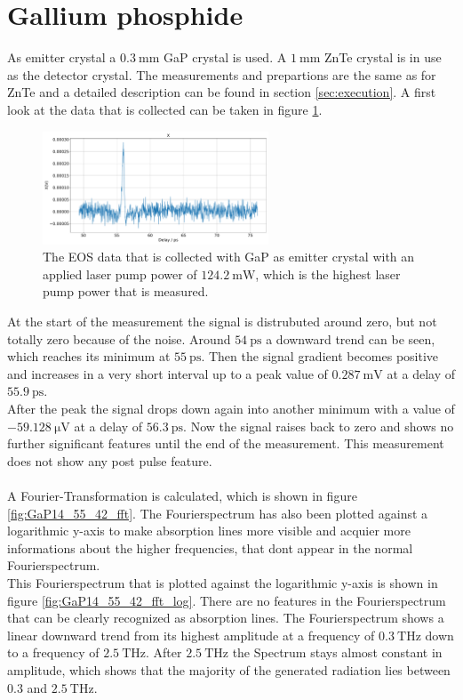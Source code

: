 \section{Gallium phosphide}
As emitter crystal a $\SI{0.3}{\milli\meter}$ GaP crystal is used.
A $\SI{1}{\milli\meter}$ ZnTe crystal is in use as the detector crystal.
The measurements and prepartions are the same as for ZnTe and a detailed description can be found in section \ref{sec:execution}.
A first look at the data that is collected can be taken in figure \ref{fig:GaP14_55_42normalX}.
\\
\begin{figure}
    \centering
    \includegraphics[width=0.6\textwidth]{Plots/GaP14_55_42normalX.pdf}
    \caption{The EOS data that is collected with GaP as emitter crystal with an applied laser pump power of $\SI{124.2}{\milli\W}$, which is the highest laser pump power that is measured.}
    \label{fig:GaP14_55_42normalX}
\end{figure}
At the start of the measurement the signal is distrubuted around zero, but not totally zero because of the noise.
Around $\SI{54}{\pico\second}$ a downward trend can be seen, which reaches its minimum at $\SI{55}{\pico\second}$.
Then the signal gradient becomes positive and increases in a very short interval up to a peak value of $\SI{0.287}{\milli\V}$ at a delay of $\SI{55.9}{\pico\second}$.
\\
After the peak the signal drops down again into another minimum with a value of $\SI{-59.128}{\micro\V}$ at a delay of $\SI{56.3}{\pico\second}$.
Now the signal raises back to zero and shows no further significant features until the end of the measurement.
This measurement does not show any post pulse feature.
\\\\
A Fourier-Transformation is calculated, which is shown in figure \ref{fig:GaP14_55_42_fft}.
The Fourierspectrum has also been plotted against a logarithmic y-axis to make absorption lines more visible and acquier more informations about the higher frequencies, that dont appear in the normal Fourierspectrum.
\\
This Fourierspectrum that is plotted against the logarithmic y-axis is shown in figure \ref{fig:GaP14_55_42_fft_log}.
There are no features in the Fourierspectrum that can be clearly recognized as absorption lines.
The Fourierspectrum shows a linear downward trend from its highest amplitude at a frequency of $\SI{0.3}{\tera\hertz}$ down to a frequency of $\SI{2.5}{\tera\hertz}$.
After $\SI{2.5}{\tera\hertz}$ the Spectrum stays almost constant in amplitude, which shows that the majority of the generated radiation lies between $0.3$ and $\SI{2.5}{\tera\hertz}$.

